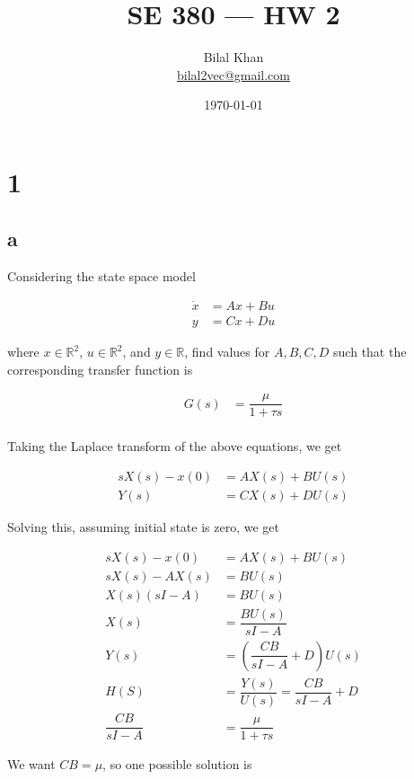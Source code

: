 \documentclass[11pt]{article}
\title{SE 380 — HW 2}
\author{Bilal Khan\\
\href{mailto:bilal2vec@gmail.com}{bilal2vec@gmail.com}}
\date{\today}
\begin{document}
\maketitle

\tableofcontents

\section{1}

\subsection{a}

Considering the state space model

\begin{align*}
    \dot{x} &= Ax + Bu \\
    y &= Cx + Du
\end{align*}

where $x \in \mathbb{R}^2$, $u \in \mathbb{R}^2$, and $y \in \mathbb{R}$, find values for $A, B, C, D$ such that the corresponding transfer function is

\begin{align*}
    G(s) &= \dfrac{\mu}{1 + \tau s} \\
\end{align*}

Taking the Laplace transform of the above equations, we get

\begin{align*}
    sX(s) - x(0) &= AX(s) + BU(s) \\
    Y(s) &= CX(s) + DU(s)
\end{align*}

Solving this, assuming initial state is zero, we get

\begin{align*}
    sX(s) - x(0) &= AX(s) + BU(s) \\
    sX(s) - AX(s) &= BU(s) \\
    X(s) (sI - A) &= BU(s) \\
    X(s) &= \dfrac{BU(s)}{sI - A} \\
    Y(s) &= \left( \dfrac{CB}{sI - A} + D \right) U(s) \\
    H(S) &= \dfrac{Y(s)}{U(s)} = \dfrac{CB}{sI - A} + D \\
    \dfrac{CB}{sI - A} &= \dfrac{\mu}{1 + \tau s}
\end{align*}

We want $CB = \mu$, so one possible solution is
\end{document}
